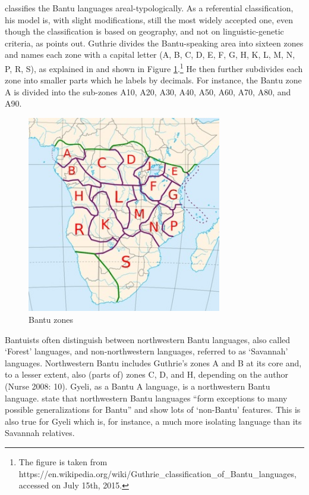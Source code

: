 \citet{guthrie71} classifies the Bantu languages areal-typologically. As a referential classification, his model is, with slight modifications, still the most widely accepted one, even though the classification is based on geography, and not on linguistic-genetic criteria, as \citet[46]{maho2001} points out. Guthrie divides the Bantu-speaking area into sixteen zones and names each zone with a capital letter (A, B, C, D, E, F, G, H, K, L, M, N, P, R, S), as explained in \citet[3]{nurse03} and shown in Figure \ref{Fig:Bantu-zones}.\footnote{The figure is taken from https://en.wikipedia.org/wiki/Guthrie\_classification\_of\_Bantu\_languages, accessed on July 15th, 2015.} He then further subdivides each zone into smaller parts which he labels by decimals. For instance, the Bantu zone A is divided into the sub-zones A10, A20, A30, A40, A50, A60, A70, A80, and A90. 
\begin{figure}[!h]
\centering
\includegraphics[width=8.5cm]{figures/Bantu-zones.jpg}
\caption{Bantu zones}
\label{Fig:Bantu-zones}
\end{figure}


Bantuists often distinguish between northwestern Bantu languages, also called `Forest' languages, and non-northwestern languages, referred to as `Savannah' languages. Northwestern Bantu includes Guthrie's zones A and B at its core and, to a lesser extent, also (parts of) zones C, D, and H, depending on the author (Nurse 2008: 10). Gyeli, as a Bantu A language, is a northwestern Bantu language. \citet[5]{nurse03} state that northwestern Bantu languages ``form exceptions to many possible generalizations for Bantu'' and show lots of `non-Bantu' features. This is also true for Gyeli which is, for instance, a much more isolating language than its Savannah relatives.


